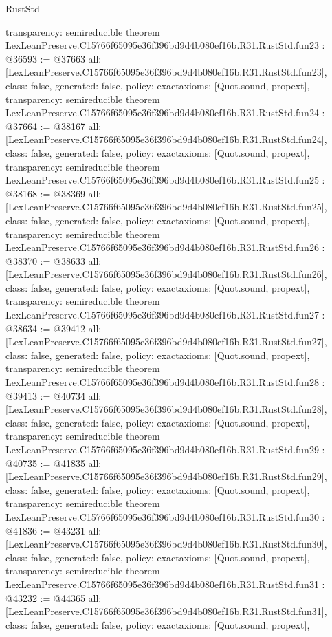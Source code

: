 \begin{lexlean}{RustStd}
\begin{coremodule}
{  transparency: semireducible
}
theorem LexLeanPreserve.C15766f65095e36f396bd9d4b080ef16b.R31.RustStd.fun23 : @36593 := @37663 {
  all: [LexLeanPreserve.C15766f65095e36f396bd9d4b080ef16b.R31.RustStd.fun23],
  class: false,
  generated: false,
  policy: exact{axioms: [Quot.sound, propext]},
  transparency: semireducible
}
theorem LexLeanPreserve.C15766f65095e36f396bd9d4b080ef16b.R31.RustStd.fun24 : @37664 := @38167 {
  all: [LexLeanPreserve.C15766f65095e36f396bd9d4b080ef16b.R31.RustStd.fun24],
  class: false,
  generated: false,
  policy: exact{axioms: [Quot.sound, propext]},
  transparency: semireducible
}
theorem LexLeanPreserve.C15766f65095e36f396bd9d4b080ef16b.R31.RustStd.fun25 : @38168 := @38369 {
  all: [LexLeanPreserve.C15766f65095e36f396bd9d4b080ef16b.R31.RustStd.fun25],
  class: false,
  generated: false,
  policy: exact{axioms: [Quot.sound, propext]},
  transparency: semireducible
}
theorem LexLeanPreserve.C15766f65095e36f396bd9d4b080ef16b.R31.RustStd.fun26 : @38370 := @38633 {
  all: [LexLeanPreserve.C15766f65095e36f396bd9d4b080ef16b.R31.RustStd.fun26],
  class: false,
  generated: false,
  policy: exact{axioms: [Quot.sound, propext]},
  transparency: semireducible
}
theorem LexLeanPreserve.C15766f65095e36f396bd9d4b080ef16b.R31.RustStd.fun27 : @38634 := @39412 {
  all: [LexLeanPreserve.C15766f65095e36f396bd9d4b080ef16b.R31.RustStd.fun27],
  class: false,
  generated: false,
  policy: exact{axioms: [Quot.sound, propext]},
  transparency: semireducible
}
theorem LexLeanPreserve.C15766f65095e36f396bd9d4b080ef16b.R31.RustStd.fun28 : @39413 := @40734 {
  all: [LexLeanPreserve.C15766f65095e36f396bd9d4b080ef16b.R31.RustStd.fun28],
  class: false,
  generated: false,
  policy: exact{axioms: [Quot.sound, propext]},
  transparency: semireducible
}
theorem LexLeanPreserve.C15766f65095e36f396bd9d4b080ef16b.R31.RustStd.fun29 : @40735 := @41835 {
  all: [LexLeanPreserve.C15766f65095e36f396bd9d4b080ef16b.R31.RustStd.fun29],
  class: false,
  generated: false,
  policy: exact{axioms: [Quot.sound, propext]},
  transparency: semireducible
}
theorem LexLeanPreserve.C15766f65095e36f396bd9d4b080ef16b.R31.RustStd.fun30 : @41836 := @43231 {
  all: [LexLeanPreserve.C15766f65095e36f396bd9d4b080ef16b.R31.RustStd.fun30],
  class: false,
  generated: false,
  policy: exact{axioms: [Quot.sound, propext]},
  transparency: semireducible
}
theorem LexLeanPreserve.C15766f65095e36f396bd9d4b080ef16b.R31.RustStd.fun31 : @43232 := @44365 {
  all: [LexLeanPreserve.C15766f65095e36f396bd9d4b080ef16b.R31.RustStd.fun31],
  class: false,
  generated: false,
  policy: exact{axioms: [Quot.sound, propext]},
}
\end{coremodule}
\end{lexlean}
